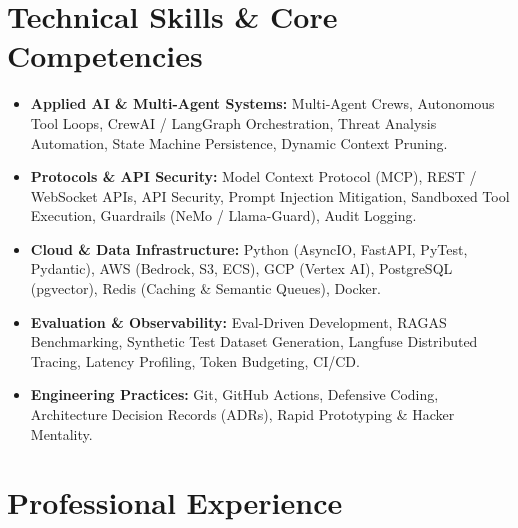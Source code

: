 \documentclass[a4paper,10pt]{article}
\begin{document}
\section{Technical Skills \& Core Competencies}
\begin{itemize}[leftmargin=1.2em, itemsep=2pt]
  \item \textbf{Applied AI \& Multi-Agent Systems:} Multi-Agent Crews, Autonomous Tool Loops, CrewAI / LangGraph Orchestration, Threat Analysis Automation, State Machine Persistence, Dynamic Context Pruning.
  \item \textbf{Protocols \& API Security:} Model Context Protocol (MCP), REST / WebSocket APIs, API Security, Prompt Injection Mitigation, Sandboxed Tool Execution, Guardrails (NeMo / Llama-Guard), Audit Logging.
  \item \textbf{Cloud \& Data Infrastructure:} Python (AsyncIO, FastAPI, PyTest, Pydantic), AWS (Bedrock, S3, ECS), GCP (Vertex AI), PostgreSQL (pgvector), Redis (Caching \& Semantic Queues), Docker.
  \item \textbf{Evaluation \& Observability:} Eval-Driven Development, RAGAS Benchmarking, Synthetic Test Dataset Generation, Langfuse Distributed Tracing, Latency Profiling, Token Budgeting, CI/CD.
  \item \textbf{Engineering Practices:} Git, GitHub Actions, Defensive Coding, Architecture Decision Records (ADRs), Rapid Prototyping \& Hacker Mentality.
\end{itemize}

\section{Professional Experience}
\end{document}

